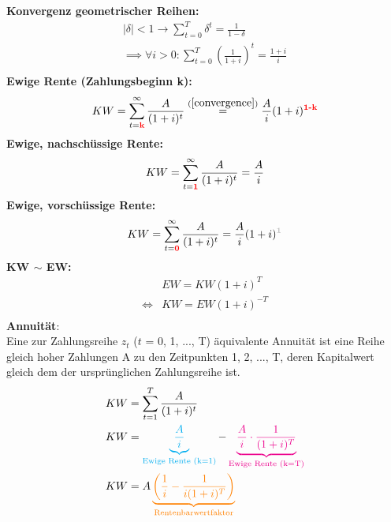 \documentclass[leqno]{scrartcl}
\begin{document}
\begin{multicols}{4}
\textbf{Konvergenz geometrischer Reihen:}
  \begin{equation*}\label{convergence}
    \begin{split}
    |\delta|<1 \rightarrow \sum^T_{t=0}\delta^t=\frac{1}{1-\delta}\\
    \implies \forall i > 0 : \sum^T_{t=0}\left(\frac{1}{1+i}\right)^t  = \frac{1+i}{i}\\
    \end{split}
  \end{equation*}
\textbf{Ewige Rente (Zahlungsbeginn k):}
  \begin{equation*}
    KW = \sum^{\infty}_{t=\color{red}{\textbf{k}}}\frac{A}{(1+i)^t} \overset{(\ref{convergence})}{=}\frac{A}{i}(1+i)^{\color{red}{\textbf{1-k}}}
  \end{equation*}
\textbf{Ewige, nachschüssige Rente:}
  \begin{equation*}
    KW = \sum^{\infty}_{t=\color{red}{\textbf{1}}}\frac{A}{(1+i)^t}=\frac{A}{i}
  \end{equation*}
\textbf{Ewige, vorschüssige  Rente:}
  \begin{equation*}
    KW = \sum^{\infty}_{t=\color{red}{\textbf{0}}}\frac{A}{(1+i)^t}=\frac{A}{i}(1+i)^{\color{lightgray}{\textbf{1}}}
  \end{equation*}
\textbf{KW $\sim$ EW:}
  \begin{equation*}\label{relation}
    \begin{split}
    &EW = KW (1+i)^{T}\\
    \iff &KW = EW (1+i)^{-T} \\
    \end{split}
  \end{equation*}
\textbf{Annuität}:\\
  Eine zur Zahlungsreihe $z_t$ ($t$ = 0, 1, ..., T) äquivalente Annuität ist eine Reihe 
  gleich hoher Zahlungen A zu den Zeitpunkten 1, 2, ..., T, deren Kapitalwert 
  gleich dem der ursprünglichen Zahlungsreihe ist.
  \begin{equation*}
    \begin{split}
      KW &= \sum^T_{t=1}\frac{A}{(1+i)^t}\\
      KW &= \color{cyan}\underbrace{\frac{A}{i}}_\text{Ewige Rente (k=1)}
            \color{black}-
            \color{magenta}\underbrace{\frac{A}{i}\cdot\frac{1}{(1+i)^T}}_\text{Ewige Rente (k=T)}\\
      KW &= A\color{orange} \underbrace{\left(\frac{1}{i}-\frac{1}{i(1+i)^T}\right)}_\text{Rentenbarwertfaktor}\\

\end{split}
\end{equation*}
\end{multicols}
\end{document}

